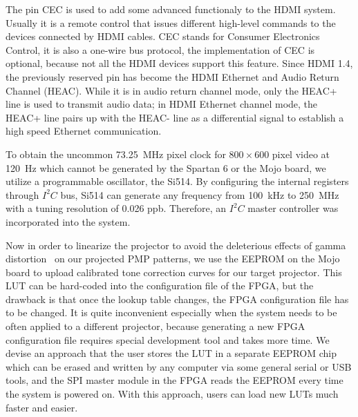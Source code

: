 \documentclass[]{spie}  %
\begin{document}
The pin CEC is used to add some advanced functionaly to the HDMI system. Usually it is a remote control that issues different high-level commands to the devices connected by HDMI cables. CEC stands for Consumer Electronics Control, it is also a one-wire bus protocol, the implementation of CEC is optional, because not all the HDMI devices support this feature. Since HDMI 1.4, the previously reserved pin has become the HDMI Ethernet and Audio Return Channel (HEAC). While it is in audio return channel mode, only the HEAC+ line is used to transmit audio data; in HDMI Ethernet channel mode, the HEAC+ line pairs up with the HEAC- line as a differential signal to establish a high speed Ethernet communication.

To obtain the uncommon 73.25~MHz pixel clock for $800\times 600$ pixel video at 120~Hz which cannot be generated by the Spartan 6 or the Mojo board, we utilize a programmable oscillator, the Si514. By configuring the internal registers through $I^2C$ bus, Si514 can generate any frequency from 100~kHz to 250~MHz with a tuning resolution of 0.026 ppb. Therefore, an $I^2C$ master controller was incorporated into the system.%

Now in order to linearize the projector to avoid the deleterious effects of gamma distortion~\cite{gamm10} on our projected PMP patterns, we use the EEPROM on the Mojo board to upload calibrated tone correction curves for our target projector.
This LUT can be hard-coded into the configuration file of the FPGA, but the drawback is that once the lookup table changes, the FPGA configuration file has to be changed. It is quite inconvenient especially when the system needs to be often applied to a different projector, because generating a new FPGA configuration file requires special development tool and takes more time. We devise an approach that the user stores the LUT in a separate EEPROM chip which can be erased and written by any computer via some general serial or USB tools, and the SPI master module in the FPGA reads the EEPROM every time the system  is powered on. With this approach, users can load new LUTs much faster and easier.
\end{document}

